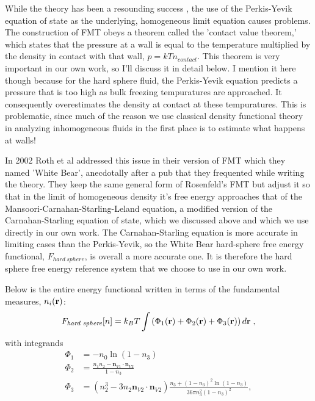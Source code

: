 While the theory has been a resounding
  success \cite{rosenfeld1989free,rosenfeld1990free,rosenfeld1997fundamental},
  the use of the Perkis-Yevik equation of state as the underlying,
  homogeneous limit equation causes problems.  The construction of FMT
  obeys a theorem called the 'contact value theorem,' which states
  that the pressure at a wall is equal to the temperature multiplied
  by the density in contact with that wall, $p=kTn_{contact}$. This
  theorem is very important in our own work, so I'll discuss it in
  detail below.  I mention it here though because for the hard sphere
  fluid, the Perkis-Yevik equation predicts a pressure that is too
  high as bulk freezing tempuratures are approached.  It consequently
  overestimates the density at contact at these tempuratures.  This is
  problematic, since much of the reason we use classical density
  functional theory in analyzing inhomogeneous fluids in the first
  place is to estimate what happens at walls!

In 2002 Roth et al addressed this issue in their version of FMT which
they named 'White Bear'\cite{roth2002whitebear,hansen2006density},
anecdotally after a pub that they frequented while writing the theory.
They keep the same general form of Rosenfeld's FMT but adjust it so
that in the limit of homogeneous density it's free energy approaches
that of the Mansoori-Carnahan-Starling-Leland equation, a modified
version of the Carnahan-Starling equation of state, which we discussed
above and which we use directly in our own work.  The
Carnahan-Starling equation is more accurate in limiting cases than the
Perkis-Yevik, so the White Bear hard-sphere free energy functional,
$F_{hard~sphere}$, is overall a more accurate one.  It is therefore
the hard sphere free energy reference system that we choose to use in
our own work.

Below is the entire energy functional written in terms of the
fundamental measures, $n_i(\textbf{r})$:
\begin{equation}
F_\textit{hard~sphere}[n] = k_B T \int \left(\Phi_1(\textbf{r}) + \Phi_2(\textbf{r}) + \Phi_3(\textbf{r})\right) d\textbf{r} \; ,
\end{equation}
with integrands
\begin{align}
\Phi_1 &= -n_0 \ln\left( 1 - n_3\right) \label{eq:Phi1}\\
\Phi_2 &= \frac{n_1 n_2 - \mathbf{n}_{V1} \cdot\mathbf{n}_{V2}}{1-n_3} \\
\Phi_3 &= (n_2^3 - 3 n_2 \mathbf{n}_{V2} \cdot \mathbf{n}_{V2}) \frac{
  n_3 + (1-n_3)^2 \ln(1-n_3)
}{
  36\pi n_3^2\left( 1 - n_3 \right)^2
} , \label{eq:Phi3}
\end{align}

